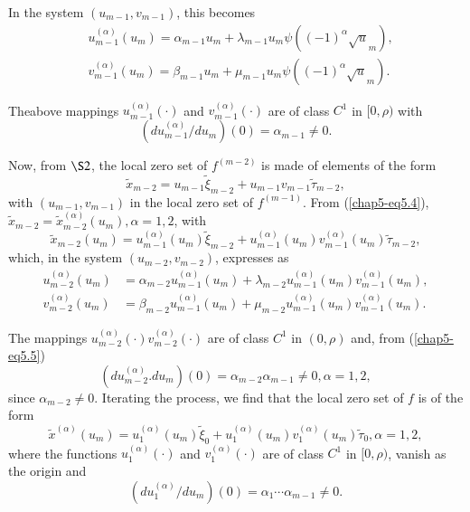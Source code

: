 In the system $(u_{m-1}, v_{m-1})$, this becomes
\begin{align*}
& u_{m-1}^{(\alpha)} (u_{m}) = \alpha_{m-1}u_{m} + \lambda_{m-1} u_{m}
\psi((-1)^{\alpha} \surd u_{m}),\\
& v_{m-1}^{(\alpha)} (u_{m}) = \beta_{m-1}u_{m} + \mu_{m-1} u_{m} \psi
((-1)^{\alpha} \surd u_{m}).\tag{5.4}\label{chap5-eq5.4}
\end{align*}

The\pageoriginale above mappings $u_{m-1}^{(\alpha)} (\cdot)$ and $v_{m-1}^{(\alpha)} (\cdot)$ are of class $C^{1}$ in $[0, \rho)$ with
\begin{equation*}
(du_{m-1}^{(\alpha)}/ du_{m}) (0) = \alpha_{m-1} \neq 0.\tag{5.5}\label{chap5-eq5.5}
\end{equation*}

Now, from $\S 2$, the local zero set of $f^{(m-2)}$ is made of elements of the form
$$
\widetilde{x}_{m-2} = u_{m-1} \widetilde{\xi}_{m-2} + u_{m-1} v_{m-1} \widetilde{\tau}_{m-2}, 
$$
with $(u_{m-1}, v_{m-1})$ in the local zero set of $f^{(m-1)}$. From (\ref{chap5-eq5.4}), $\widetilde{x}_{m-2} = \widetilde{x}_{m-2}^{(\alpha)} (u_{m}), \alpha = 1, 2$, with
$$
\widetilde{x}_{m-2} (u_{m}) = u_{m-1}^{(\alpha)} (u_{m})\widetilde{\xi}_{m-2} + u_{m-1}^{(\alpha)} (u_{m}) v_{m-1}^{(\alpha)} (u_{m}) \widetilde{\tau}_{m-2},
$$
which, in the system $(u_{m-2}, v_{m-2})$, expresses as
\begin{align*}
u_{m-2}^{(\alpha)} (u_{m}) & = \alpha_{m-2} u_{m-1}^{(\alpha)} (u_{m}) + \lambda_{m-2} u_{m-1}^{(\alpha)} (u_{m}) v_{m-1}^{(\alpha)} (u_{m}),\\
v_{m-2}^{(\alpha)} (u_{m}) & = \beta_{m-2} u_{m-1}^{(\alpha)} (u_{m}) + \mu_{m-2} u_{m-1}^{(\alpha)} (u_{m}) v_{m-1}^{(\alpha)} (u_{m}).
\end{align*}

The mappings $u_{m-2}^{(\alpha)} (\cdot) v_{m-2}^{(\alpha)} (\cdot)$ are of class $C^{1}$ in $(0, \rho)$ and, from (\ref{chap5-eq5.5})
$$
(du_{m-2}^{(\alpha)} . du_{m}) (0) = \alpha_{m-2} \alpha_{m-1} \neq 0, \alpha = 1, 2,
$$
since $\alpha_{m-2} \neq 0$. Iterating the process, we find that the local zero set of $f$ is of the form
$$
\widetilde{x}^{(\alpha)} (u_{m}) = u_{1}^{(\alpha)} (u_{m})\widetilde{\xi}_{0} + u_{1}^{(\alpha)} (u_{m}) v_{1}^{(\alpha)} (u_{m})\widetilde{\tau}_{0}, \alpha = 1, 2, 
$$
where the functions $u_{1}^{(\alpha)} (\cdot)$ and $v_{1}^{(\alpha)} (\cdot)$ are of class $C^{1}$ in $[0, \rho)$, vanish as the origin and
$$
(du_{1}^{(\alpha)} / du_{m})(0) = \alpha_{1} \cdots \alpha_{m-1} \neq 0.
$$

